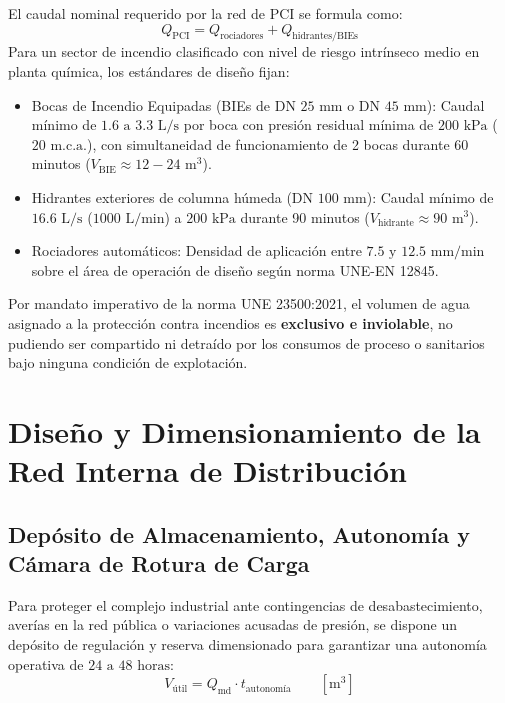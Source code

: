 \documentclass{report}
\begin{document}
El caudal nominal requerido por la red de PCI se formula como:
\begin{equation}
    Q_{\text{PCI}} = Q_{\text{rociadores}} + Q_{\text{hidrantes/BIEs}}
    \label{eq:caudal_pci}
\end{equation}
Para un sector de incendio clasificado con nivel de riesgo intrínseco medio en planta química, los estándares de diseño fijan:
\begin{itemize}
    \item Bocas de Incendio Equipadas (BIEs de $\text{DN }25\text{ mm}$ o $\text{DN }45\text{ mm}$): Caudal mínimo de $1.6\text{ a }3.3\text{ L/s}$ por boca con presión residual mínima de $200\text{ kPa}$ ($20\text{ m.c.a.}$), con simultaneidad de funcionamiento de 2 bocas durante 60 minutos ($V_{\text{BIE}} \approx 12 - 24\text{ m}^3$).
    \item Hidrantes exteriores de columna húmeda ($\text{DN }100\text{ mm}$): Caudal mínimo de $16.6\text{ L/s}$ ($1000\text{ L/min}$) a $200\text{ kPa}$ durante 90 minutos ($V_{\text{hidrante}} \approx 90\text{ m}^3$).
    \item Rociadores automáticos: Densidad de aplicación entre $7.5\text{ y }12.5\text{ mm/min}$ sobre el área de operación de diseño según norma UNE-EN 12845.
\end{itemize}

Por mandato imperativo de la norma UNE 23500:2021, el volumen de agua asignado a la protección contra incendios es \textbf{exclusivo e inviolable}, no pudiendo ser compartido ni detraído por los consumos de proceso o sanitarios bajo ninguna condición de explotación.

\section{Diseño y Dimensionamiento de la Red Interna de Distribución}

\subsection{Depósito de Almacenamiento, Autonomía y Cámara de Rotura de Carga}

Para proteger el complejo industrial ante contingencias de desabastecimiento, averías en la red pública o variaciones acusadas de presión, se dispone un depósito de regulación y reserva dimensionado para garantizar una autonomía operativa de $24\text{ a }48\text{ horas}$:
\begin{equation}
    V_{\text{útil}} = Q_{\text{md}} \cdot t_{\text{autonomía}} \qquad \left[\text{m}^3\right]
    \label{eq:volumen_deposito}
\end{equation}
\end{document}
